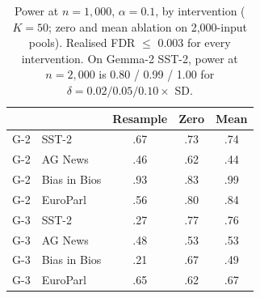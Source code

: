 \begin{table}[H]
\centering
\small
\setlength{\tabcolsep}{3pt}
\begin{tabular}{llccc}
\toprule
 & & Resample & Zero & Mean \\
\midrule
G-2 & SST-2 & .67 & .73 & .74 \\
G-2 & AG News & .46 & .62 & .44 \\
G-2 & Bias in Bios & .93 & .83 & .99 \\
G-2 & EuroParl & .56 & .80 & .84 \\
G-3 & SST-2 & .27 & .77 & .76 \\
G-3 & AG News & .48 & .53 & .53 \\
G-3 & Bias in Bios & .21 & .67 & .49 \\
G-3 & EuroParl & .65 & .62 & .67 \\
\bottomrule
\end{tabular}
\caption{Power at $n = 1{,}000$, $\alpha = 0.1$, by intervention ($K = 50$; zero and mean
ablation on 2,000-input pools). Realised FDR $\le$ 0.003 for every intervention. On Gemma-2 SST-2,
power at $n = 2{,}000$ is 0.80 / 0.99 / 1.00 for $\delta = 0.02 / 0.05 / 0.10 \times$ SD.}
\label{tab:sensitivity}
\end{table}




